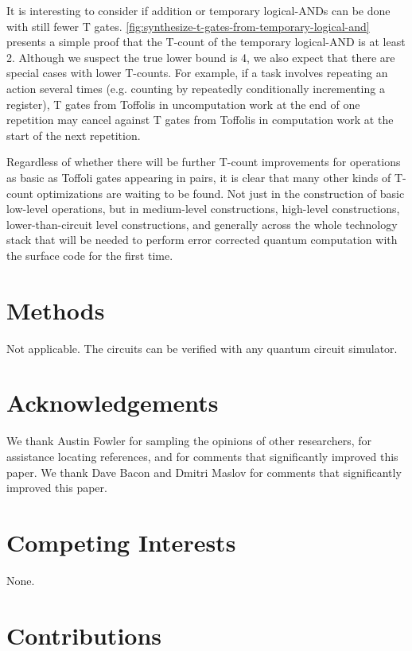 \documentclass[twocolumn]{revtex4-1}
\begin{document}
It is interesting to consider if addition or temporary logical-ANDs can be done with still fewer T gates.
\autoref{fig:synthesize-t-gates-from-temporary-logical-and} presents a simple proof that the T-count of the temporary logical-AND is at least 2.
Although we suspect the true lower bound is 4, we also expect that there are special cases with lower T-counts.
For example, if a task involves repeating an action several times (e.g. counting by repeatedly conditionally incrementing a register), T gates from Toffolis in uncomputation work at the end of one repetition may cancel against T gates from Toffolis in computation work at the start of the next repetition.


Regardless of whether there will be further T-count improvements for operations as basic as Toffoli gates appearing in pairs, it is clear that many other kinds of T-count optimizations are waiting to be found.
Not just in the construction of basic low-level operations, but in medium-level constructions, high-level constructions, lower-than-circuit level constructions, and generally across the whole technology stack that will be needed to perform error corrected quantum computation with the surface code for the first time.


\section*{Methods}

Not applicable. The circuits can be verified with any quantum circuit simulator.


\section*{Acknowledgements}

We thank Austin Fowler for sampling the opinions of other researchers, for assistance locating references, and for comments that significantly improved this paper.
We thank Dave Bacon and Dmitri Maslov for comments that significantly improved this paper.


\section*{Competing Interests}

None.

\section*{Contributions}
\end{document}
